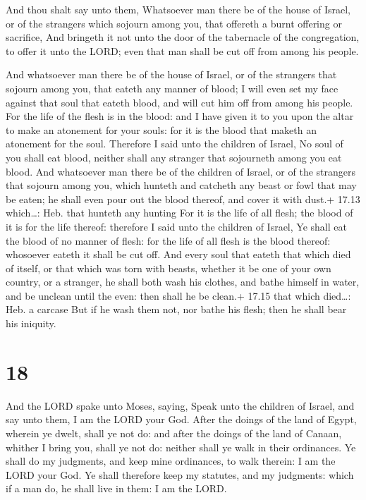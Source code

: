  And thou shalt say unto them, Whatsoever man there be of
the house of Israel, or of the strangers which sojourn among you, that
offereth a burnt offering or sacrifice,  And bringeth it not
unto the door of the tabernacle of the congregation, to offer it unto
the LORD; even that man shall be cut off from among his people.

 And whatsoever man there be of the house of Israel, or
of the strangers that sojourn among you, that eateth any manner of
blood; I will even set my face against that soul that eateth blood, and
will cut him off from among his people.  For the life of
the flesh is in the blood: and I have given it to you upon the altar to
make an atonement for your souls: for it is the blood that maketh an
atonement for the soul.  Therefore I said unto the children
of Israel, No soul of you shall eat blood, neither shall any stranger
that sojourneth among you eat blood.  And whatsoever man
there be of the children of Israel, or of the strangers that sojourn
among you, which hunteth and catcheth any beast or fowl that may be
eaten; he shall even pour out the blood thereof, and cover it with
dust.+ 17.13 which\ldots: Heb. that hunteth any hunting 
For it is the life of all flesh; the blood of it is for the life
thereof: therefore I said unto the children of Israel, Ye shall eat the
blood of no manner of flesh: for the life of all flesh is the blood
thereof: whosoever eateth it shall be cut off.  And every
soul that eateth that which died of itself, or that which was torn with
beasts, whether it be one of your own country, or a stranger, he shall
both wash his clothes, and bathe himself in water, and be unclean until
the even: then shall he be clean.+ 17.15 that which died\ldots: Heb. a
carcase  But if he wash them not, nor bathe his flesh; then
he shall bear his iniquity.

\hypertarget{section-17}{%
\section{18}\label{section-17}}

 And the LORD spake unto Moses, saying,  Speak
unto the children of Israel, and say unto them, I am the LORD your God.
 After the doings of the land of Egypt, wherein ye dwelt,
shall ye not do: and after the doings of the land of Canaan, whither I
bring you, shall ye not do: neither shall ye walk in their ordinances.
 Ye shall do my judgments, and keep mine ordinances, to walk
therein: I am the LORD your God.  Ye shall therefore keep my
statutes, and my judgments: which if a man do, he shall live in them: I
am the LORD.


